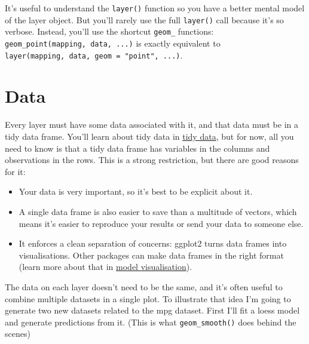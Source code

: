 It's useful to understand the \texttt{layer()} function so you have a
better mental model of the layer object. But you'll rarely use the full
\texttt{layer()} call because it's so verbose. Instead, you'll use the
shortcut \texttt{geom\_} functions:
\texttt{geom\_point(mapping,\ data,\ ...)} is exactly equivalent to
\texttt{layer(mapping,\ data,\ geom\ =\ "point",\ ...)}.

\hypertarget{sec:data}{%
\section{Data}\label{sec:data}}

Every layer must have some data associated with it, and that data must
be in a tidy data frame. You'll learn about tidy data in
\protect\hyperlink{cha:data}{tidy data}, but for now, all you need to
know is that a tidy data frame has variables in the columns and
observations in the rows. This is a strong restriction, but there are
good reasons for it:  

\begin{itemize}
\item
  Your data is very important, so it's best to be explicit about it.
\item
  A single data frame is also easier to save than a multitude of
  vectors, which means it's easier to reproduce your results or send
  your data to someone else.
\item
  It enforces a clean separation of concerns: ggplot2 turns data frames
  into visualisations. Other packages can make data frames in the right
  format (learn more about that in
  \protect\hyperlink{sub:modelvis}{model visualisation}).
\end{itemize}

The data on each layer doesn't need to be the same, and it's often
useful to combine multiple datasets in a single plot. To illustrate that
idea I'm going to generate two new datasets related to the mpg dataset.
First I'll fit a loess model and generate predictions from it. (This is
what \texttt{geom\_smooth()} does behind the scenes)

